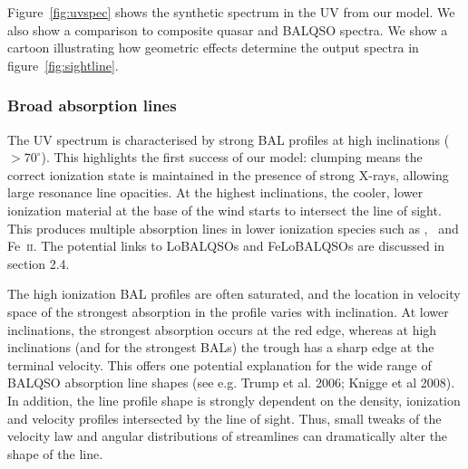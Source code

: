 \documentclass[useAMS,usenatbib]{mn2e_x}
\begin{document}



Figure~\ref{fig:uvspec} shows the synthetic spectrum in the UV from our model. 
We also show a comparison to composite quasar and BALQSO spectra.
We show a cartoon illustrating how geometric effects determine
the output spectra in figure~\ref{fig:sightline}.

\subsubsection{Broad absorption lines}

The UV spectrum is characterised by strong BAL 
profiles at high inclinations ($> 70^\circ$). 
This highlights the first success of our model: 
clumping means the correct ionization state 
is maintained in the presence of strong X-rays, 
allowing large resonance line opacities. 
At the highest inclinations, the 
cooler, lower ionization material at the base of the wind
starts to intersect the line of sight. This produces 
multiple absorption lines in lower ionization species such as \mg,
\al\ and Fe~\textsc{ii}. The potential links to LoBALQSOs and 
FeLoBALQSOs are discussed in section 2.4.

The high ionization BAL profiles are often saturated, and the location in velocity space
of the strongest absorption in the profile varies with inclination.
At lower inclinations, the strongest absorption occurs at the red edge,
whereas at high inclinations (and for the strongest BALs)
the trough has a sharp edge at the terminal velocity.
This offers one potential explanation for the wide range of BALQSO absorption
line shapes (see e.g. Trump et al. 2006; Knigge et al 2008).
In addition, the line profile shape is strongly dependent 
on the density, ionization and velocity 
profiles intersected by the line of sight. Thus, small tweaks of the velocity
law and angular distributions of streamlines can dramatically alter
the shape of the line.
\end{document}

